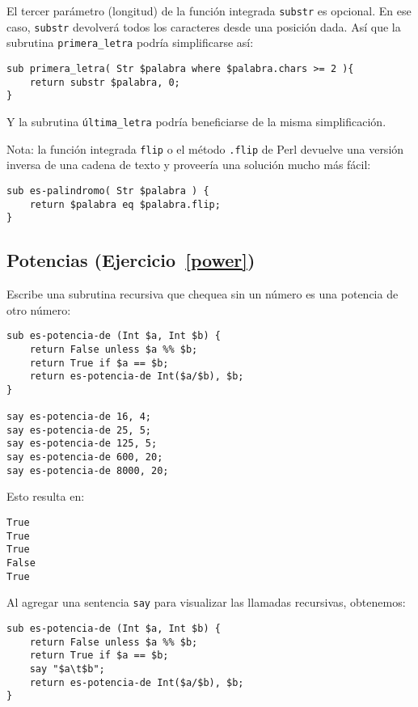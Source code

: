 El tercer parámetro (longitud) de la función integrada {\tt substr}
es opcional. En ese caso, {\tt substr} devolverá todos los
caracteres desde una posición dada. Así que la subrutina
\verb|primera_letra| podría simplificarse así:

\begin{verbatim}
sub primera_letra( Str $palabra where $palabra.chars >= 2 ){
	return substr $palabra, 0;
}
\end{verbatim} 

Y la subrutina \verb|última_letra| podría beneficiarse de la
misma simplificación.

Nota: la función integrada {\tt flip} o el método {\tt .flip}
de Perl devuelve una versión inversa de una cadena de texto 
y proveería una solución mucho más fácil:

\begin{verbatim}
sub es-palindromo( Str $palabra ) {
    return $palabra eq $palabra.flip;
}
\end{verbatim}

\subsection{Potencias (Ejercicio~\ref{power})}
\label{sol_power}

Escribe una subrutina recursiva que chequea sin un número es una
potencia de otro número:

\begin{verbatim}
sub es-potencia-de (Int $a, Int $b) {
    return False unless $a %% $b;
    return True if $a == $b;
    return es-potencia-de Int($a/$b), $b;
}

say es-potencia-de 16, 4;
say es-potencia-de 25, 5;
say es-potencia-de 125, 5;
say es-potencia-de 600, 20;
say es-potencia-de 8000, 20;
\end{verbatim}
%

Esto resulta en:
\begin{verbatim}
True
True
True
False
True
\end{verbatim}

Al agregar una sentencia {\tt say} para visualizar las llamadas recursivas,
obtenemos:

\begin{verbatim}
sub es-potencia-de (Int $a, Int $b) {     
    return False unless $a %% $b;      
    return True if $a == $b;           
    say "$a\t$b";                      
    return es-potencia-de Int($a/$b), $b; 
}                                      
\end{verbatim}

